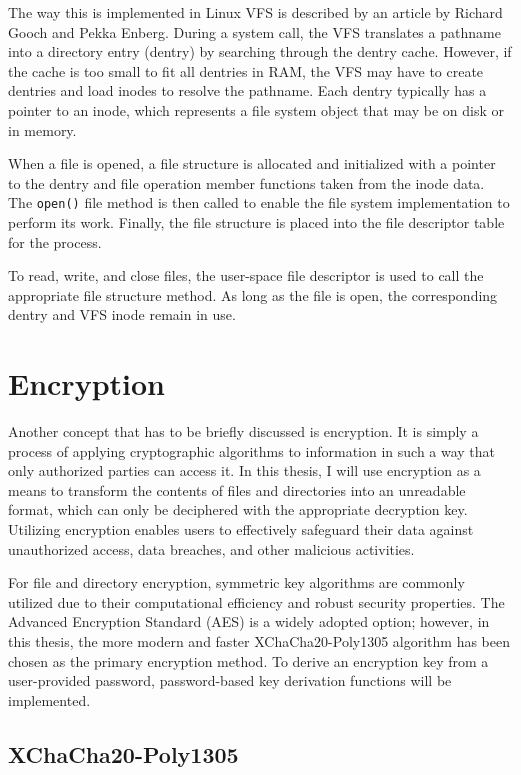 The way this is implemented in Linux VFS is described by an article by Richard Gooch and Pekka Enberg\cite{vfs}.
During a system call, the VFS translates a pathname into a directory entry (dentry) by searching through the dentry cache.
However, if the cache is too small to fit all dentries in RAM, the VFS may have to create dentries and load inodes to resolve the pathname.
Each dentry typically has a pointer to an inode, which represents a file system object that may be on disk or in memory.

When a file is opened, a file structure is allocated and initialized with a pointer to the dentry and file operation member functions taken from the inode data.
The \texttt{open()} file method is then called to enable the file system implementation to perform its work.
Finally, the file structure is placed into the file descriptor table for the process.

To read, write, and close files, the user-space file descriptor is used to call the appropriate file structure method.
As long as the file is open, the corresponding dentry and VFS inode remain in use.


\section{Encryption}\label{sec:encryption-approaches}

Another concept that has to be briefly discussed is encryption.
It is simply a process of applying cryptographic algorithms to information in such a way that only authorized parties can access it.
In this thesis, I will use encryption as a means to transform the contents of files and directories into an unreadable format, which can only be deciphered with the appropriate decryption key.
Utilizing encryption enables users to effectively safeguard their data against unauthorized access, data breaches, and other malicious activities.

For file and directory encryption, symmetric key algorithms are commonly utilized due to their computational efficiency and robust security properties.
The Advanced Encryption Standard (AES) is a widely adopted option; however, in this thesis, the more modern and faster XChaCha20-Poly1305 algorithm has been chosen as the primary encryption method.
To derive an encryption key from a user-provided password, password-based key derivation functions will be implemented.

\subsection{XChaCha20-Poly1305}\label{subsec:xchacha20-poly1305}


